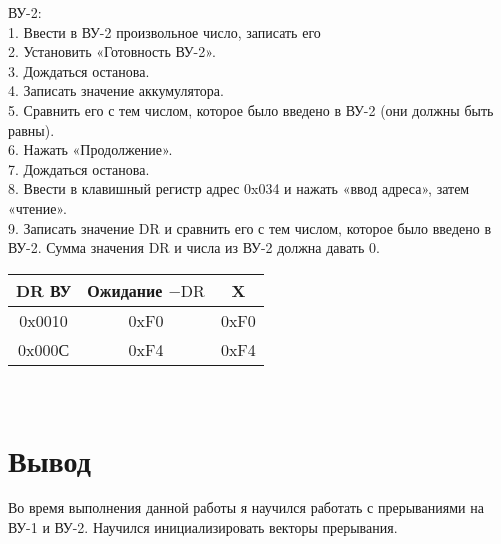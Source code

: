\noindent ВУ-2: \\ 
1. Ввести в ВУ-2 произвольное число, записать его \\
2. Установить «Готовность ВУ-2». \\
3. Дождаться останова. \\
4. Записать значение аккумулятора. \\
5. Сравнить его с тем числом, которое было введено в ВУ-2 (они должны быть равны). \\
6. Нажать «Продолжение». \\
7. Дождаться останова. \\
8. Ввести в клавишный регистр адрес 0x034 и нажать «ввод адреса», затем «чтение». \\
9. Записать значение DR и сравнить его с тем числом, которое было введено в ВУ-2. Сумма значения DR и числа из ВУ-2 должна давать 0. \\

\begin{tabular}{|c|c|c|}
\hline
DR ВУ & Ожидание $-\text{DR}$ & X \\
\hline
0x0010 & 0xF0 & 0xF0 \\
\hline
0x000С & 0xF4 & 0xF4 \\
\hline
\end{tabular} \\
\section{Вывод}
Во время выполнения данной работы я научился работать с прерываниями на ВУ-1 и ВУ-2. Научился инициализировать векторы прерывания.

